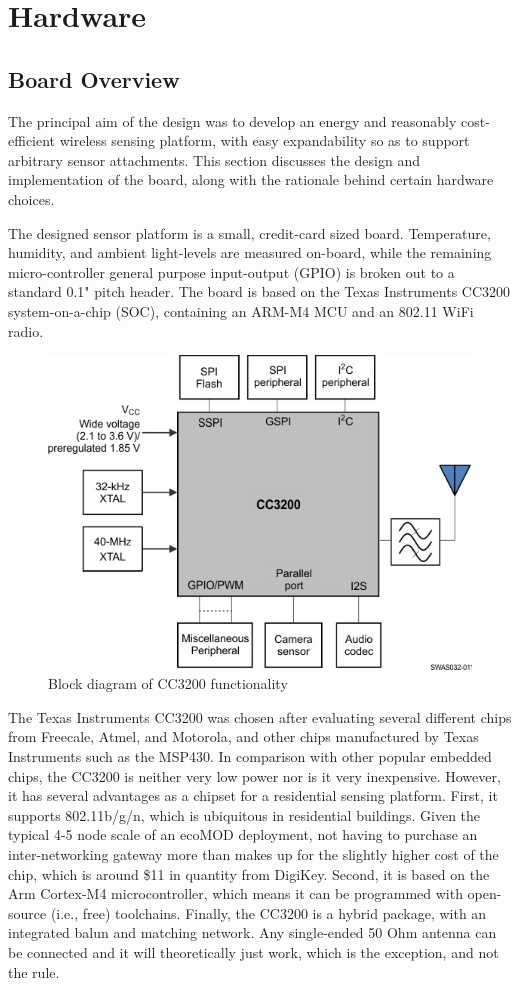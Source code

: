 \chapter{Hardware}

\section{Board Overview}
The principal aim of the design was to develop an energy and reasonably cost-efficient wireless sensing platform, with easy expandability so as to support arbitrary sensor attachments. This section discusses the design and implementation of the board, along with the rationale behind certain hardware choices.

The designed sensor platform is a small, credit-card sized board. Temperature, humidity, and ambient light-levels are measured on-board, while the remaining micro-controller general purpose input-output (GPIO) is broken out to a standard 0.1" pitch header. The board is based on the Texas Instruments CC3200 system-on-a-chip (SOC), containing an ARM-M4 MCU and an 802.11 WiFi radio.

\begin{figure}
\centering
\includegraphics[width=0.5\linewidth]{images/cc3200-block}
\caption[CC3200 Block Diagram]{Block diagram of CC3200 functionality\cite{2015}}
\label{fig:cc3200-block}
\end{figure}


The Texas Instruments CC3200 was chosen after evaluating several different chips from Freecale, Atmel, and Motorola, and other chips manufactured by Texas Instruments such as the MSP430. In comparison with other popular embedded chips, the CC3200 is neither very low power nor is it very inexpensive. However, it has several advantages as a chipset for a residential sensing platform. First, it supports 802.11b/g/n, which is ubiquitous in residential buildings. Given the typical 4-5 node scale of an ecoMOD deployment, not having to purchase an inter-networking gateway more than makes up for the slightly higher cost of the chip, which is around \$11 in quantity from DigiKey. Second, it is based on the Arm Cortex-M4 microcontroller, which means it can be programmed with open-source (i.e., free) toolchains. Finally, the CC3200 is a hybrid package, with an integrated balun and matching network. Any single-ended 50 Ohm antenna can be connected and it will theoretically just work, which is the exception, and not the rule. 

